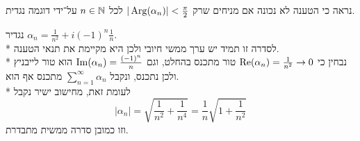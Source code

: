 \Subquestion{}
נראה כי הטענה לא נכונה אם מניחים שרק $|\operatorname{Arg}(\alpha_n)| < \frac{\pi}{2}$ לכל $n \in \mathbb{N}$ על־ידי דוגמה נגדית.
\begin{solution}
	נגדיר $\alpha_n = \frac{1}{n^2} + i {(-1)}^n \frac{1}{n}$. \\*
	לסדרה זו תמיד יש ערך ממשי חיובי ולכן היא מקיימת את תנאי הטענה. \\*
	נבחין כי $\operatorname{Re}(\alpha_n) = \frac{1}{n^2} \to 0$ טור מתכנס בהחלט, וגם $\operatorname{Im}(\alpha_n) = \frac{{(-1)}^n}{n}$ הוא טור לייבניץ ולכן נתכנס, ונקבל $\sum_{n = 1}^{\infty} \alpha_n$ מתכנס אף הוא. \\*
	לעומת זאת, מחישוב ישיר נקבל
	\[
		|\alpha_n| = \sqrt{\frac{1}{n^2} + \frac{1}{n^4}} = \frac{1}{n} \sqrt{1 + \frac{1}{n^2}}
	\]
	וזו כמובן סדרה ממשית מתבדרת.
\end{solution}



